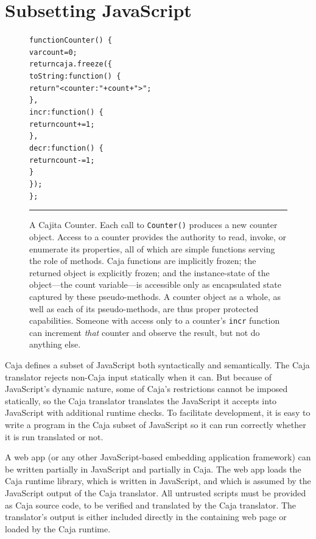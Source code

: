 \documentclass[letterpaper,twocolumn,10pt]{article}
\newcommand{\code}[1]{{\tt {#1}}}              %
\begin{document}
\section{Subsetting JavaScript}
\label{sec:subset}

\begin{figure}[t!]
\begin{alltt}
function Counter()\ \{
  var count = 0;
  return caja.freeze(\{
    toString: function()\ \{ 
      return "<counter: " + count + ">"; 
    \},
    incr: function()\ \{ 
      return count += 1; 
    \},
    decr: function()\ \{ 
      return count -= 1; 
    \}
  \});
\};
\end{alltt}

\caption[A Cajita Counter.]{A Cajita Counter. Each call to \code{Counter()} 
produces a new counter object. Access to a counter provides the authority to 
read, invoke, or enumerate its properties, all of which are simple functions 
serving the role of methods. Caja functions are implicitly frozen; the 
returned object is explicitly frozen; and the instance-state of the 
object---the count variable---is accessible only as encapsulated state 
captured by these pseudo-methods. A counter object as a whole, as well as 
each of its pseudo-methods, are thus proper protected capabilities. Someone 
with access only to a counter's \code{incr} function can increment 
\emph{that} counter and observe the result, but not do anything else.
 \\ } \hrule
\label{fig:cajita-counter}
\end{figure}

Caja defines a subset of JavaScript both syntactically and semantically. The 
Caja translator rejects non-Caja input statically when it can. But because of 
JavaScript's dynamic nature, some of Caja's restrictions cannot be imposed 
statically, so the Caja translator translates the JavaScript it accepts into 
JavaScript with additional runtime checks. To facilitate development, it is 
easy to write a program in the Caja subset of JavaScript so it can run 
correctly whether it is run translated or not.

A web app (or any other JavaScript-based embedding application framework) can 
be written partially in JavaScript and partially in Caja. The web app loads 
the Caja runtime library, which is written in JavaScript, and which is 
assumed by the JavaScript output of the Caja translator. All untrusted 
scripts must be provided as Caja source code, to be verified and translated 
by the Caja translator. The translator's output is either included directly 
in the containing web page or loaded by the Caja runtime.
\end{document}
